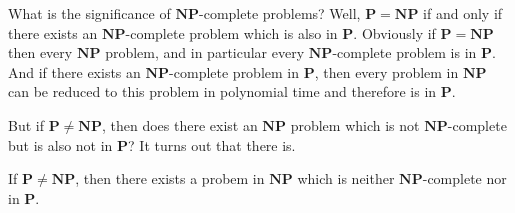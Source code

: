 \documentclass[10pt]{article}
\def\P{\mathbf{P}}
\def\NP{\mathbf{NP}}
\begin{document}


\bigskip

What is the significance of $\NP$-complete problems?
Well, $\P=\NP$ if and only if there exists an $\NP$-complete problem which is also in $\P$.
Obviously if $\P=\NP$ then every $\NP$ problem, and in particular every $\NP$-complete problem is in $\P$.
And if there exists an $\NP$-complete problem in $\P$, then every problem in $\NP$ can be reduced to this problem in polynomial time and therefore is in $\P$.

But if $\P\neq\NP$, then does there exist an $\NP$ problem which is not $\NP$-complete but is also not in $\P$?
It turns out that there is.

\begin{thrm*}

    If $\P\neq\NP$, then there exists a probem in $\NP$ which is neither $\NP$-complete nor in $\P$.

\end{thrm*}
\end{document}
